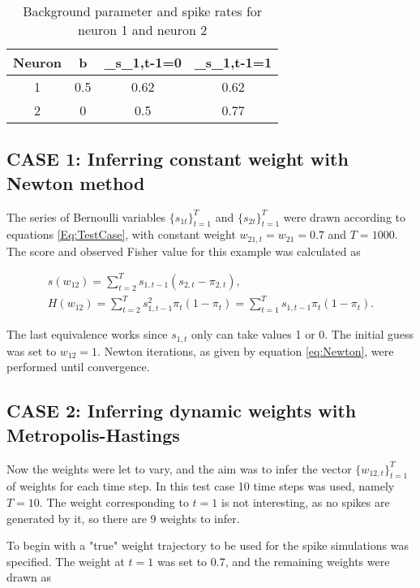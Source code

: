 \begin{table}[!h]
\centering
\begin{tabular}{|c|c|c|c|}
	\hline
	Neuron & b & \pi_{s_{1,t-1}=0} & \pi_{s_{1,t-1}=1} \\
	\hline\hline
	1 & 0.5 & 0.62 & 0.62\\
	\hline
	2 & 0  & 0.5 & 0.77\\
	\hline
\end{tabular}
\caption{Background parameter and spike rates for neuron 1 and neuron 2}
\label{table:parameters}
\end{table}

\subsection{CASE 1: Inferring constant weight with Newton method}

The series of Bernoulli variables $\{s_{1t}\}_{t=1}^T$ and $\{s_{2t}\}_{t=1}^T$ were drawn according to equations \ref{Eq:TestCase}, with constant weight $w_{21,t} = w_{21} = 0.7$ and $T=1000$. The score and observed Fisher value for this example was calculated as 

\begin{equation}
\begin{split}
    s(w_{12}) = \sum_{t=2}^{T} s_{1, t-1} (s_{2,t}-\pi_{2,t}), \\
    H(w_{12}) = \sum_{t=2}^T s_{1, t-1}^2 \pi_t(1-\pi_t) = \sum_{t=1}^T s_{1, t-1} \pi_t(1-\pi_t).
\end{split}
\end{equation}

The last equivalence works since $s_{1,t}$ only can take values 1 or 0. The initial guess was set to $w_{12} = 1$. Newton iterations, as given by equation \ref{eq:Newton}, were performed until convergence.\\ 

\subsection{CASE 2: Inferring dynamic weights with Metropolis-Hastings}
Now the weights were let to vary, and the aim was to infer the vector $\{w_{12,t}\}_{t=1}^T$ of weights for each time step. In this test case 10 time steps was used, namely $T=10$. The weight corresponding to $t = 1$ is not interesting, as no spikes are generated by it, so there are 9 weights to infer.

To begin with a "true" weight trajectory to be used for the spike simulations was specified. The weight at $t=1$ was set to 0.7, and the remaining weights were drawn as

